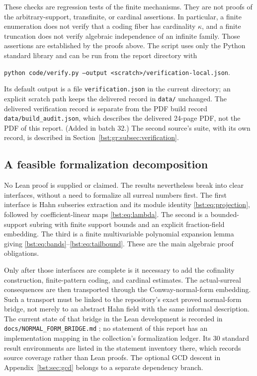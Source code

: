 \documentclass[11pt,letterpaper]{article}
\theoremstyle{definition}
\theoremstyle{remark}
\begin{document}
These checks are regression tests of the finite mechanisms. They are not
proofs of the arbitrary-support, transfinite, or cardinal assertions.
In particular, a finite enumeration does not verify that a coding fiber
has cardinality $\kappa$, and a finite truncation does not verify algebraic
independence of an infinite family. Those assertions are established by
the proofs above. The script uses only the Python standard library and
can be run from the report directory with
\begin{center}
\texttt{python code/verify.py --output <scratch>/verification-local.json}.
\end{center}
Its default output is a file \texttt{verification.json} in the current
directory; an explicit scratch path keeps the delivered record in
\texttt{data/} unchanged. The delivered verification record is separate from
the PDF build record \texttt{data/build\_audit.json}, which describes the
delivered 24-page PDF, not the PDF of this report.
(Added in batch 32.) The second source's suite, with its own record, is
described in Section~\ref{bst:gr:subsec:verification}.

\subsection{A feasible formalization decomposition}

No Lean proof is supplied or claimed. The results nevertheless break into
clear interfaces, without a need to formalize all surreal numbers first.
The first interface is Hahn subseries extraction and its module identity
\eqref{bst:eq:projection}, followed by coefficient-linear maps
\eqref{bst:eq:lambda}. The second is a bounded-support subring with finite
support bounds and an explicit fraction-field embedding. The third is a
finite multivariable polynomial expansion lemma giving
\eqref{bst:eq:bands}--\eqref{bst:eq:tailbound}. These are the main algebraic proof
obligations.

Only after those interfaces are complete is it necessary to add the
cofinality construction, finite-pattern coding, and cardinal estimates.
The actual-surreal consequences are then transported through the
Conway-normal-form embedding. Such a transport must be linked to the
repository's exact proved normal-form bridge, not merely to an abstract
Hahn field with the same informal description. The current state of that
bridge in the Lean development is recorded in
\texttt{docs/NORMAL\_FORM\_BRIDGE.md} \cite{RepoBridge}; no statement of this
report has an implementation mapping in the collection's formalization
ledger. Its 30 standard result environments are listed in the statement
inventory there, which records source coverage rather than Lean proofs. The optional GCD descent
in Appendix~\ref{bst:sec:gcd} belongs to a separate dependency branch.
\end{document}
